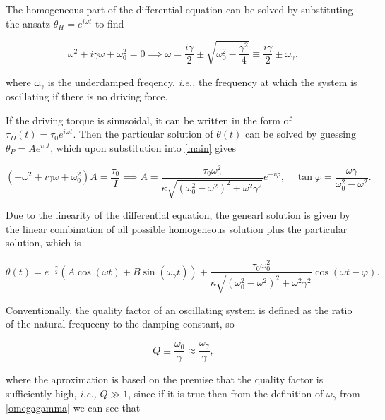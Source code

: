 \documentclass[11pt]{article}
\begin{document}
The homogeneous part of the differential equation can be solved by substituting the ansatz \(\theta_{H}  = e^{i \omega t} \) to find

\begin{equation}
    \omega ^2 + i \gamma \omega + \omega _{0}^2 = 0 \implies \omega = \frac{i \gamma }{2} \pm \sqrt{\omega _{0}^2 - \frac{\gamma ^2}{4}  } \equiv \frac{i \gamma }{2} \pm \omega _{\gamma }, \label{omegagamma} 
\end{equation}

where \(\omega _{\gamma } \) is the underdamped freqency, \textit{i.e.,} the frequency at which the system is oscillating if there is no driving force.

If the driving torque is sinusoidal, it can be written in the form of \(\tau _{D}(t) = \tau _{0}e^{i \omega t}   \). Then the particular solution of \(\theta (t)\) can be solved by guessing \(\theta _{P} = Ae^{i \omega t}  \), which upon substitution into \cref{main} gives

\begin{equation}
    (-\omega ^2 + i \gamma \omega +\omega _{0}^2 ) A = \frac{\tau _{0} }{I} \implies A = \frac{\tau _{0} \omega _{0}^2 }{\kappa  \sqrt{ (\omega _{0}^2-\omega ^2 )^2+\omega ^2\gamma ^2 }} e^{-i \varphi }, \quad \tan \varphi  = \frac{\omega \gamma }{\omega _{0}^2 - \omega ^2 }.  
\end{equation}

Due to the linearity of the differential equation, the genearl solution is given by the linear combination of all possible homogeneous solution plus the particular solution, which is 

\begin{equation}
    \theta (t) = e^{-\frac{\gamma }{2} } \left( A \cos (\omega t) + B\sin (\omega _{\gamma } t) \right) + \frac{\tau _{0} \omega _{0}^2 }{\kappa  \sqrt{ (\omega _{0}^2-\omega ^2 )^2+\omega ^2\gamma ^2 }} \cos (\omega t-\varphi ).
\end{equation}

Conventionally, the quality factor of an oscillating system is defined as the ratio of the natural frequecny to the damping constant, so

\begin{equation}
    Q \equiv \frac{\omega _{0} }{\gamma } \approx \frac{\omega _{\gamma } }{\gamma },
\end{equation}

where the aproximation is based on the premise that the quality factor is sufficiently high, \textit{i.e.,} \(Q \gg 1\), since if it is true then from the definition of \(\omega _{\gamma } \) from \cref{omegagamma} we can see that 
\end{document}
